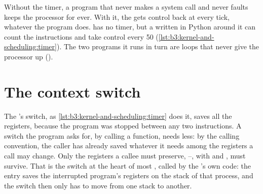 Without the timer, a program that never makes a system call and never faults keeps the processor for ever. With it, the  gets control back at every tick, whatever the program does.  has no timer, but a  written in Python around it can count the instructions and take control every 50 (\cref{lst:b3:kernel-and-scheduling:timer}). The two programs it runs in turn are loops that never give the processor up ().

\label{lst:b3:kernel-and-scheduling:timer}

\label{out:b3:kernel-and-scheduling:timer}

\section{The context switch}\label{sec:b3:kernel-and-scheduling:switch}

The 's switch, as \cref{lst:b3:kernel-and-scheduling:timer} does it, saves all the registers, because the program was stopped between any two instructions. A switch the program asks for, by calling a function, needs less: by the calling convention, the caller has already saved whatever it needs among the registers a call may change. Only the registers a callee must preserve, --, with  and , must survive. %
That is the switch at the heart of most , called by the 's own code: the  entry saves the interrupted program's registers on the  stack of that process, and the switch then only has to move from one  stack to another.

